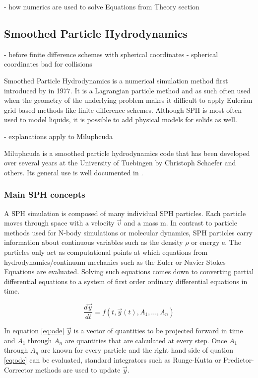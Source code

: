 - how numerics are used to solve Equations from Theory section

\subsection{Smoothed Particle Hydrodynamics}
- before finite difference schemes with spherical coordinates
- spherical coordinates bad for collisions


Smoothed Particle Hydrodynamics is a numerical simulation method first introduced by \cite{Monaghan_1977} in 1977. It is a Lagrangian particle method and as such often used when the geometry of the underlying problem makes it difficult to apply Eulerian grid-based methods like finite difference schemes. Although SPH is most often used to model liquids, it is possible to add physical models for solids as well.

- explanations apply to Miluphcuda

Miluphcuda is a smoothed particle hydrodynamics code that has been developed over several years at the University of Tuebingen by Christoph Schaefer and others. Its general use is well documented in \cite{Schaefer_2016}.

\subsubsection{Main SPH concepts}
A SPH simulation is composed of many individual SPH particles. Each particle moves through space with a velocity $\vec{v}$ and a mass m. In contrast to particle methods used for N-body simulations or molecular dynamics, SPH particles carry information about continuous variables such as the density $\rho$ or energy e. The particles only act as computational points at which equations from hydrodynamics/continuum mechanics such as the Euler or Navier-Stokes Equations are evaluated. Solving such equations comes down to converting partial differential equations to a system of first order ordinary differential equations in time.

\begin{equation} \label{eq:ode}
    \frac{d\vec{y}}{dt} = f(t, \vec{y}(t), A_1, ..., A_n)
\end{equation}

In equation \ref{eq:ode} $\vec{y}$ is a vector of quantities to be projected forward in time and $A_1$ through $A_n$ are quantities that are calculated at every step. Once $A_1$ through $A_n$ are known for every particle and the right hand side of quation \ref{eq:ode} can be evaluated, standard integrators such as Runge-Kutta or Predictor-Corrector methods are used to update $\vec{y}$.

